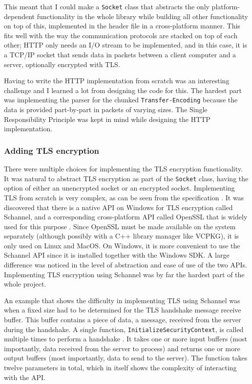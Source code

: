 \documentclass[12pt, a4paper]{article}
\begin{document}
This meant that I could make a \texttt{Socket} class that abstracts the only platform-dependent functionality in the whole library while building all other functionality on top of this, implemented in the header file in a cross-platform manner. This fits well with the way the communication protocols are stacked on top of each other; HTTP only needs an I/O stream to be implemented, and in this case, it is a TCP/IP socket that sends data in packets between a client computer and a server, optionally encrypted with TLS. 

Having to write the HTTP implementation from scratch was an interesting challenge and I learned a lot from designing the code for this. The hardest part was implementing the parser for the chunked \texttt{Transfer-Encoding} because the data is provided part-by-part in packets of varying sizes. The Single Responsibility Principle was kept in mind while designing the HTTP implementation.
\subsubsection{Adding TLS encryption}
There were multiple choices for implementing the TLS encryption functionality. It was natural to abstract TLS encryption as part of the \texttt{Socket} class, having the option of either an unencrypted socket or an encrypted socket. Implementing TLS from scratch is very complex, as can be seen from the specification \parencite{TlsSpec}. It was discovered that there is a native API on Windows for TLS encryption called Schannel, and a corresponding cross-platform API called OpenSSL that is widely used for this purpose \parencite{OpenSSL}. Since OpenSSL must be made available on the system separately (although possibly with a C++ library manager like VCPKG), it is only used on Linux and MacOS. On Windows, it is more convenient to use the Schannel API since it is installed together with the Windows SDK. A large difference was noticed in the level of abstraction and ease of use of the two APIs. Implementing TLS encryption using Schannel was by far the hardest part of the whole project. 

An example that shows the difficulty in implementing TLS using Schannel was when a fixed size had to be determined for the TLS handshake message receive buffer. This buffer contains a piece of data, a message, received from the server during the handshake. A single function, \texttt{InitializeSecurityContext}, is called multiple times to perform a handshake \parencite{MicrosoftInitializeSecurityContext}. It takes one or more input buffers (most importantly, data received from the server to process) and returns one or more output buffers (most importantly, data to send to the server). The function takes twelve parameters in total, which in itself shows the complexity of interacting with the API.
\end{document}
